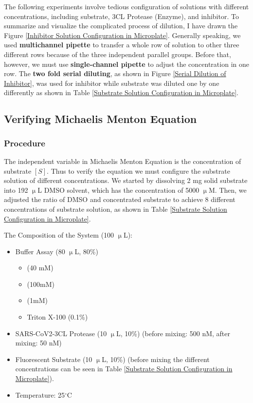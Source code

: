 \documentclass{report}
\begin{document}
The following experiments involve tedious configuration of solutions with different concentrations, including substrate, 3CL Protease (Enzyme), and inhibitor.
To summarize and visualize the complicated process of dilution, I have drawn the Figure \ref{Inhibitor Solution Configuration in Microplate}.
Generally speaking, we used \textbf{multichannel pipette} to transfer a whole row of solution to other three different rows because of the three independent parallel groups.
Before that, however, we must use \textbf{single-channel pipette} to adjust the concentration in one row.
The \textbf{two fold serial diluting}, as shown in Figure \ref{Serial Dilution of Inhibitor}, was used for inhibitor while substrate was diluted one by one differently as shown in Table \ref{Substrate Solution Configuration in Microplate}.

\subsection{Verifying Michaelis Menton Equation}
\subsubsection{Procedure}

The independent variable in Michaelis Menton Equation is the concentration of substrate $[S]$.
Thus to verify the equation we must configure the substrate solution of different concentrations.
We started by dissolving 2 mg solid substrate into 192 $\upmu$L DMSO solvent, which has the concentration of 5000 $\upmu$M.
Then, we adjusted the ratio of DMSO and concentrated substrate to achieve 8 different concentrations of substrate solution, as shown in Table \ref{Substrate Solution Configuration in Microplate}.

The Composition of the System (100 $\upmu$L):
\begin{itemize}
    \item Buffer Assay (80 $\upmu$L, 80\%)
    \begin{itemize}
        \item {} (40 mM)
        \item {} (100mM)
        \item {} (1mM)
        \item Triton X-100 (0.1\%)
    \end{itemize}
    \item SARS-CoV2-3CL Protease (10 $\upmu$L, 10\%) (before mixing: 500 nM, after mixing: 50 nM)
    \item Fluorescent Substrate (10 $\upmu$L, 10\%) (before mixing the different concentrations can be seen in Table \ref{Substrate Solution Configuration in Microplate}).
    \item Temperature: 25$^\circ$C
\end{itemize}
\end{document}
